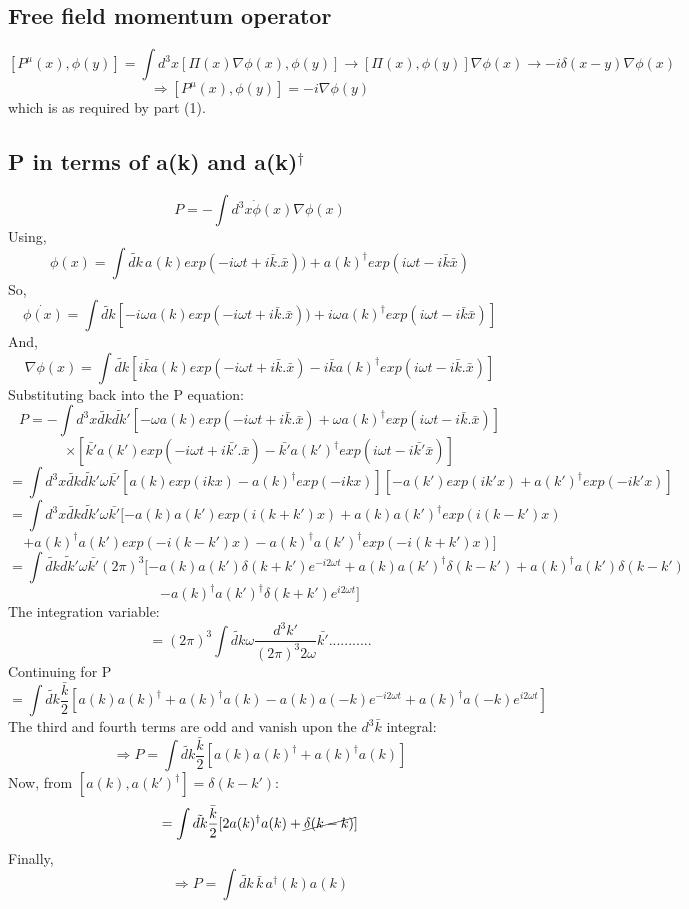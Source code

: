 \documentclass[11pt]{article}
\begin{document}
	\subsection{Free field momentum operator}
	
	\[
		[P^\mu(x),\phi(y)] = \int d^3x [\Pi(x)\nabla\phi(x), \phi(y)] \rightarrow [\Pi(x),\phi(y)]\nabla\phi(x) \rightarrow -i\delta(x-y)\nabla\phi(x)
	\]
	\[
		\Rightarrow \boxed{[P^\mu(x),\phi(y)] = -i \nabla \phi(y)}
	\]
	which is as required by part (1).
	
	\subsection{P in terms of a(k) and a(k)$^\dagger$}
	
	\[
		P = -\int d^3x \dot{\phi}(x)\nabla\phi(x)
	\]
	Using,
	\[
		\phi(x)= \int \tilde{dk} \, a(k) exp(-i\omega t + i\bar{k}.\bar{x})) + a(k)^\dagger exp(i\omega t - i\bar{k}\bar{x})
	\]
	So,
	\[
		\dot{\phi(x)} = \int \tilde{dk} [-i\omega a(k)exp(-i\omega t + i\bar{k}.\bar{x})) + i\omega a(k)^\dagger exp(i\omega t - i\bar{k}\bar{x})]
	\]
	And, 
	\[
		\nabla\phi(x) = \int \tilde{dk} [i\bar{k} a(k) exp(-i\omega t + i \bar{k}.\bar{x}) -i\bar{k} a(k)^\dagger exp(i\omega t - i \bar{k}. \bar{x})]
	\]
	Substituting back into the P equation:
	\[
		P = -\int d^3x \tilde{dk}\tilde{dk'}[-\omega a(k) exp(-i\omega t + i\bar{k}.\bar{x}) + \omega a(k)^\dagger exp(i\omega t - i \bar{k}.\bar{x})] 
	\]
	\[
	 \times [\bar{k'}a(k')exp(-i\omega t + i\bar{k'}.\bar{x}) - \bar{k'}a(k')^\dagger exp(i\omega t - i\bar{k'}\bar{x})]
	\]
	\[
		 = \int d^3x \tilde{dk}\tilde{dk'} \omega \bar{k'}[a(k)exp(ikx) - a(k)^\dagger exp(-ikx)][-a(k')exp(ik'x)+a(k')^\dagger exp(-ik'x)]
	\]
	\[
		= \int d^3x \tilde{dk}\tilde{dk'} \omega \bar{k'} [-a(k)a(k')exp(i(k+k')x) + a(k)a(k')^\dagger exp(i(k-k')x)
	\]
	\[
		+ a(k)^\dagger a(k')exp(-i(k-k')x) - a(k)^\dagger a(k')^\dagger exp(-i(k+k')x)]
	\]
	\[
		=\int \tilde{dk}\tilde{dk'}\omega \bar{k'}(2\pi)^3[-a(k)a(k')\delta(k+k')e^{-i2\omega t} +  a(k)a(k')^\dagger \delta(k-k') + a(k)^\dagger a(k')\delta(k-k')
	\]
	\[
		- a(k)^\dagger a(k')^\dagger\delta(k+k')e^{i2\omega t} ]
	\]
	The integration variable:
	\[
		= (2\pi)^3\int \tilde{dk}\omega \frac{d^3k'}{(2\pi)^3 2\omega} \bar{k'}...........
	\]
	Continuing for P
	\[
		= \int \tilde{dk} \frac{\bar{k}}{2}[a(k)a(k)^\dagger +a(k)^\dagger a(k) - a(k)a(-k)e^{-i2\omega t} +a(k)^\dagger a(-k) e^{i2\omega t} ] 
	\]
	The third and fourth terms are odd and vanish upon the \(d^3\bar{k}\) integral:
	\[
		\Rightarrow P = \int \tilde{dk} \frac{\bar{k}}{2}[a(k)a(k)^\dagger +a(k)^\dagger a(k)]	
	\]
	Now, from $[a(k), a(k')^\dagger] = \delta(k-k')$:
	\[
		= \int \tilde{dk} \frac{\bar{k}}{2}[2a(k)^\dagger a(k) +\cancel{\delta(k-k)}]
	\]
	Finally,
	\[
		\Rightarrow \boxed{P = \int \tilde{dk} \, \bar{k} \, a^\dagger (k) a(k)}
	\]
	
\end{document}

